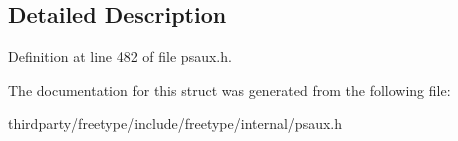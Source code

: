 \subsection{Detailed Description}


Definition at line 482 of file psaux.\+h.



The documentation for this struct was generated from the following file\+:\begin{DoxyCompactItemize}
\item 
thirdparty/freetype/include/freetype/internal/psaux.\+h\end{DoxyCompactItemize}
